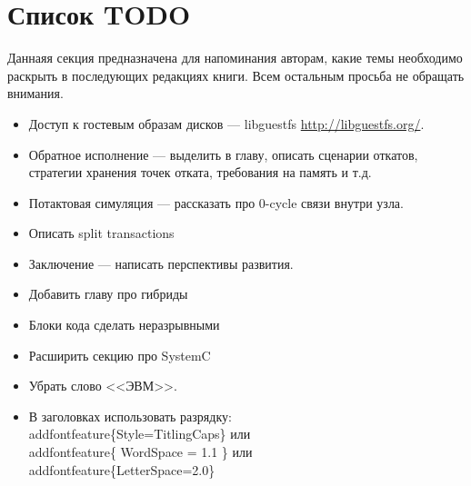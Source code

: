 \section*{Список TODO}

Даннаяя секция предназначена для напоминания авторам, какие темы необходимо раскрыть в последующих редакциях книги. Всем остальным просьба не обращать внимания.

\begin{itemize}
    \item Доступ к гостевым образам дисков --- libguestfs \url{http://libguestfs.org/}.
    \item Обратное исполнение --- выделить в главу, описать сценарии откатов, стратегии хранения точек отката, требования на память и т.д.
    \item Потактовая симуляция --- рассказать про 0-cycle связи внутри узла.
    \item Описать split transactions
    \item Заключение --- написать перспективы развития.
	\item Добавить главу про гибриды
	\item Блоки кода сделать неразрывными
	\item Расширить секцию про SystemC
    \item Убрать слово <<ЭВМ>>.
    \item В заголовках использовать разрядку: \\addfontfeature\{Style=TitlingCaps\} или \\addfontfeature\{ WordSpace = 1.1 \} или  \\addfontfeature\{LetterSpace=2.0\}

\end{itemize}
